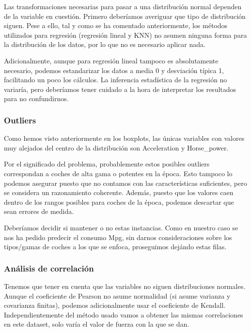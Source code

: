 Las transformaciones necesarias para pasar a una distribución normal dependen de la variable en cuestión. Primero deberíamos averiguar que tipo de distribución siguen.
Pese a ello, tal y como se ha comentado anteriormente, los métodos utilizados para regresión (regresión lineal y KNN) no asumen ninguna forma para la distribución de los datos, por lo que no es necesario aplicar nada.

Adicionalmente, aunque para regresión lineal tampoco es absolutamente necesario, podemos estandarizar los datos a media 0 y desviación típica 1, facilitando un poco los cálculos. La inferencia estadística de la regresión no variaría, pero deberíamos tener cuidado a la hora de interpretar los resultados para no confundirnos.

\subsubsection{Outliers}
Como hemos visto anteriormente en los boxplots, las únicas variables con valores muy alejados del centro de la distribución son Acceleration y Horse\_power.

\vspace{\baselineskip}

Por el significado del problema, probablemente estos posibles outliers correspondan a coches de alta gama o potentes en la época. Esto tampoco lo podemos asegurar puesto que no contamos con las características suficientes, pero se considera un razonamiento coherente. Además, puesto que los valores caen dentro de los rangos posibles para coches de la época, podemos descartar que sean errores de medida.

Deberíamos decidir si mantener o no estas instancias. Como en nuestro caso se nos ha pedido predecir el consumo Mpg, sin darnos consideraciones sobre los tipos/gamas de coches a los que se enfoca, proseguimos dejándo estas filas.

\subsubsection{Análisis de correlación}

Tenemos que tener en cuenta que las variables no siguen distribuciones normales. Aunque el coeficiente de Pearson no asume normalidad (si asume varianza y covarianza finitas), podemos adicionalmente usar el coeficiente de Kendall. Independientemente del método usado vamos a obtener las mismas correlaciones en este dataset, solo varía el valor de fuerza con la que se dan.

